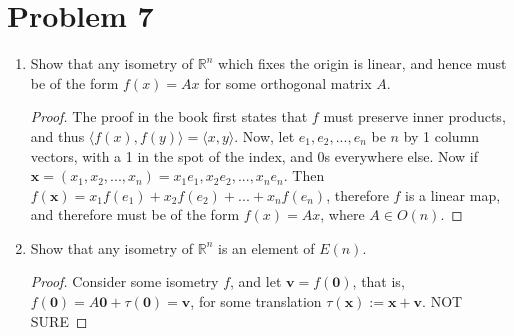 \documentclass[a4paper,12pt]{extarticle}
\theoremstyle{definition}
\newcommand{\R}{\mathbb{R}} \newcommand{\Q}{\mathbb{Q}} \newcommand{\Z}{\mathbb{Z}} \newcommand{\N}{\mathbb{N}} \newcommand{\myskip}{\par\null\par} \renewcommand\qedsymbol{QED} \renewcommand{\leq}{\leqslant}\renewcommand{\geq}{\geqslant}
\begin{document}
        \section*{Problem 7}
        \begin{enumerate}[label=(\alph*)]
            \item Show that any isometry of $\R^n$ which fixes the origin is linear, and hence must be of the form $f(x)=Ax$ for some orthogonal matrix $A$.\myskip \begin{proof}
            The proof in the book first states that $f$ must preserve inner products, and thus $\langle f(x),f(y)\rangle=\langle x,y\rangle$. Now, let $e_1,e_2,...,e_n$ be $n$ by 1 column vectors, with a 1 in the spot of the index, and 0s everywhere else. Now if $\textbf{x}=(x_1,x_2,...,x_n)=x_1e_1,x_2e_2,...,x_ne_n$. Then $f(\textbf{x})=x_1f(e_1)+x_2f(e_2)+...+x_nf(e_n)$, therefore $f$ is a linear map, and therefore must be of the form $f(x)=Ax$, where $A\in O(n)$.
            \end{proof}
            \item Show that any isometry of $\R^n$ is an element of $E(n)$.\begin{proof}
            Consider some isometry $f$, and let $\textbf{v}=f(\textbf{0})$, that is, $f(\textbf{0})=A\textbf{0}+\tau(\textbf{0})=\textbf{v}$, for some translation $\tau(\textbf{x}):=\textbf{x}+\textbf{v}$. NOT SURE
            \end{proof}
            \end{enumerate}
\end{document}
